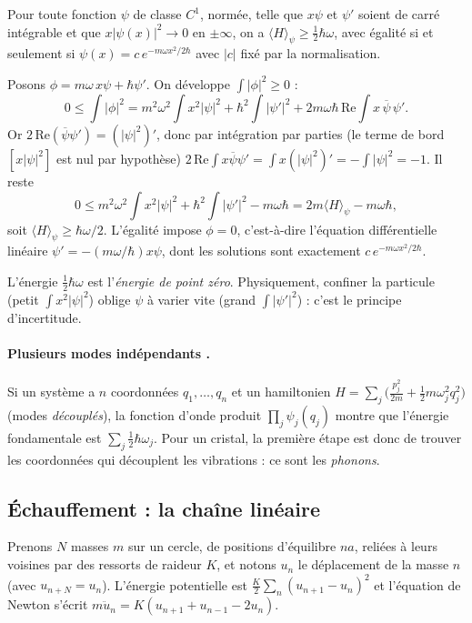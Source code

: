 \begin{proposition}\label{ch3:prop:osc}
Pour toute fonction $\psi$ de classe $C^1$, normée, telle que $x\psi$ et $\psi'$ soient de carré intégrable et que
$x|\psi(x)|^2\to0$ en $\pm\infty$, on a $\langle H\rangle_\psi\ge\tfrac12\hbar\omega$, avec égalité si et seulement si
$\psi(x)=c\,e^{-m\omega x^2/2\hbar}$ avec $|c|$ fixé par la normalisation. \tierC
\end{proposition}
\begin{humanproof}
Posons $\phi=m\omega\,x\psi+\hbar\psi'$. On développe $\int|\phi|^2\ge0$ :
\[
0\le\int|\phi|^2=m^2\omega^2\!\int x^2|\psi|^2+\hbar^2\!\int|\psi'|^2+2m\omega\hbar\,\mathrm{Re}\!\int x\,\overline{\psi}\,\psi' .
\]
Or $2\,\mathrm{Re}(\overline\psi\psi')=(|\psi|^2)'$, donc par intégration par parties (le terme de bord
$[x|\psi|^2]$ est nul par hypothèse)
$2\,\mathrm{Re}\int x\overline\psi\psi'=\int x(|\psi|^2)'=-\int|\psi|^2=-1$. Il reste
\[
0\le m^2\omega^2\!\int x^2|\psi|^2+\hbar^2\!\int|\psi'|^2-m\omega\hbar=2m\langle H\rangle_\psi-m\omega\hbar ,
\]
soit $\langle H\rangle_\psi\ge\hbar\omega/2$. L'égalité impose $\phi=0$, c'est-à-dire l'équation différentielle linéaire
$\psi'=-(m\omega/\hbar)x\psi$, dont les solutions sont exactement $c\,e^{-m\omega x^2/2\hbar}$.
\end{humanproof}
\noindent L'énergie $\tfrac12\hbar\omega$ est l'\emph{énergie de point zéro}. Physiquement, confiner la particule
(petit $\int x^2|\psi|^2$) oblige $\psi$ à varier vite (grand $\int|\psi'|^2$) : c'est le principe d'incertitude.

\paragraph{Plusieurs modes indépendants \tierC.} Si un système a $n$ coordonnées $q_1,\dots,q_n$ et un hamiltonien
$H=\sum_j\bigl(\tfrac{p_j^2}{2m}+\tfrac12m\omega_j^2q_j^2\bigr)$ (modes \emph{découplés}), la fonction d'onde produit
$\prod_j\psi_j(q_j)$ montre que l'énergie fondamentale est $\sum_j\tfrac12\hbar\omega_j$. Pour un cristal, la première
étape est donc de trouver les coordonnées qui découplent les vibrations : ce sont les \emph{phonons}.

\subsection{Échauffement : la chaîne linéaire}\label{ch3:sec:chaine}
Prenons $N$ masses $m$ sur un cercle, de positions d'équilibre $na$, reliées à leurs voisines par des ressorts de raideur
$K$, et notons $u_n$ le déplacement de la masse $n$ (avec $u_{n+N}=u_n$). L'énergie potentielle est
$\tfrac K2\sum_n(u_{n+1}-u_n)^2$ et l'équation de Newton s'écrit $m\ddot u_n=K(u_{n+1}+u_{n-1}-2u_n)$.

